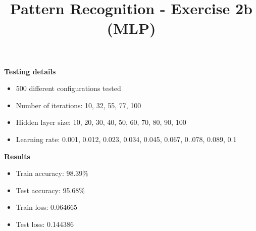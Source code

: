 \documentclass[10pt,a4paper,fullpage]{article}
\begin{document}
\title{Pattern Recognition - Exercise 2b (MLP)}
\author{}
\predate{}
\postdate{}
\date{\vspace{-5ex}}
\maketitle




\textbf{Testing details} 
\begin{itemize}
	\item 500 different configurations tested
	\item Number of iterations: 10, 32, 55, 77, 100
	\item Hidden layer size: 10, 20, 30, 40, 50, 60, 70, 80, 90, 100
	\item Learning rate: 0.001, 0.012, 0.023, 0.034, 0.045, 0.067, 0..078, 0.089, 0.1
\end{itemize}

\textbf{Results}
\begin{itemize}
	\item Train accuracy: 98.39\%
	\item Test accuracy: 95.68\%
	\item Train loss: 0.064665
	\item Test loss: 0.144386
\end{itemize}
\end{document}
